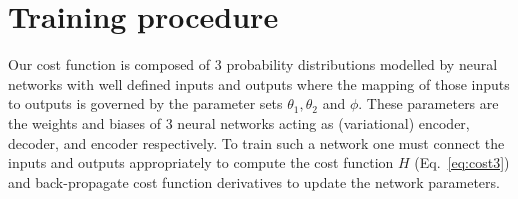 \section{Training procedure}\label{app:training_procedure}
%
%
Our cost function is composed of 3 probability distributions modelled by
neural networks with well defined inputs and outputs where the mapping of
those inputs to outputs is governed by the parameter sets
$\theta_{1},\theta_{2}$ and $\phi$. These parameters are the weights and biases
of 3 neural networks acting as (variational) encoder, decoder, and encoder
respectively. To train such a network one must connect the inputs and outputs
appropriately to compute the cost function $H$ (Eq.~\ref{eq:cost3}) and
back-propagate cost function derivatives to update the network parameters. 

